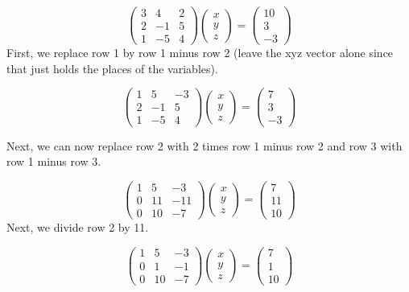 \documentclass[
]{book}
\theoremstyle{definition}
\theoremstyle{definition}
\theoremstyle{definition}
\theoremstyle{definition}
\theoremstyle{remark}
\begin{document}
\[\begin{pmatrix}3 & 4 & 2\\ 2 & -1 & 5\\ 1 & -5 & 4 \end{pmatrix} \begin{pmatrix}x \\ y \\ z \end{pmatrix} = \begin{pmatrix}10 \\ 3 \\ -3 \end{pmatrix}\]
First, we replace row 1 by row 1 minus row 2 (leave the xyz vector alone since that just holds the places of the variables).

\[\begin{pmatrix}1 & 5 & -3\\ 2 & -1 & 5\\ 1 & -5 & 4 \end{pmatrix} \begin{pmatrix}x \\ y \\ z \end{pmatrix} = \begin{pmatrix}7 \\ 3 \\ -3 \end{pmatrix}\]

Next, we can now replace row 2 with 2 times row 1 minus row 2 and row 3 with row 1 minus row 3.

\[\begin{pmatrix}1 & 5 & -3\\ 0 & 11 & -11\\ 0 & 10 & -7 \end{pmatrix} \begin{pmatrix}x \\ y \\ z \end{pmatrix} = \begin{pmatrix}7 \\ 11 \\ 10 \end{pmatrix}\]
Next, we divide row 2 by 11.

\[\begin{pmatrix}1 & 5 & -3\\ 0 & 1 & -1\\ 0 & 10 & -7 \end{pmatrix} \begin{pmatrix}x \\ y \\ z \end{pmatrix} = \begin{pmatrix}7 \\ 1 \\ 10 \end{pmatrix}\]
\end{document}

